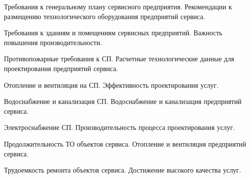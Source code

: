 \documentclass[
	14pt,
	a4paper,
	]
	{scrartcl}
\begin{document}
\vfill
\z Требования к генеральному плану сервисного предприятия.
 \vfill
\z Рекомендации к размещению технологического оборудования предприятий сервиса.
 \vfill

\vfill

\newpage


\shapk
{}
\setcounter{zad}{0}

\vfill
\z Требования к зданиям и помещениям сервисных предприятий.
 \vfill
\z Важность повышения производительности.
 \vfill

\vfill

\newpage


\shapk
{}
\setcounter{zad}{0}

\vfill
\z Противопожарные требования к СП.
 \vfill
\z Расчетные технологические данные для проектирования предприятий сервиса.
 \vfill

\vfill

\newpage


\shapk
{}
\setcounter{zad}{0}

\vfill
\z Отопление и вентиляция на СП.
 \vfill
\z Эффективность проектирования услуг.
 \vfill

\vfill

\newpage


\shapk
{}
\setcounter{zad}{0}

\vfill
\z Водоснабжение и канализация СП.
 \vfill
\z Водоснабжение и канализация предприятий сервиса.
 \vfill

\vfill

\newpage


\shapk
{}
\setcounter{zad}{0}

\vfill
\z Электроснабжение СП.
 \vfill
\z Производительность процесса проектирования услуг.
 \vfill

\vfill

\newpage


\shapk
{}
\setcounter{zad}{0}

\vfill
\z Продолжительность ТО объектов сервиса.
 \vfill
\z Отопление и вентиляция предприятий сервиса.
 \vfill

\vfill

\newpage


\shapk
{}
\setcounter{zad}{0}

\vfill
\z Трудоемкость ремонта объектов сервиса.
 \vfill
\z Достижение высокого качества услуг.
 \vfill
\end{document}
